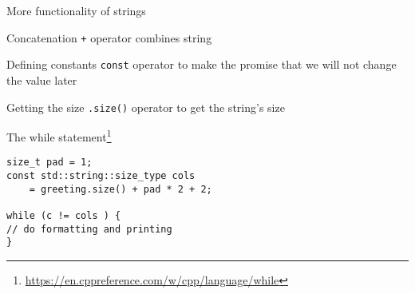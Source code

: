 \documentclass[12pt]{beamer}
\begin{document}
\begin{frame}{More functionality of strings }

\begin{block}{Concatenation}
\lstinline|+| operator combines string
\end{block}
\begin{block}{Defining constants}
\lstinline|const| operator to make the promise that we will not change the value later
\end{block}

\begin{block}{Getting the size}
\lstinline|.size()| operator to get the string's size
\end{block}
\end{frame}

\begin{frame}[fragile]{The while statement\footnote{\tiny\url{https://en.cppreference.com/w/cpp/language/while}}}
\begin{lstlisting}
size_t pad = 1;
const std::string::size_type cols 
	= greeting.size() + pad * 2 + 2;

while (c != cols ) {
// do formatting and printing
}
\end{lstlisting}
\end{frame}
\end{document}

